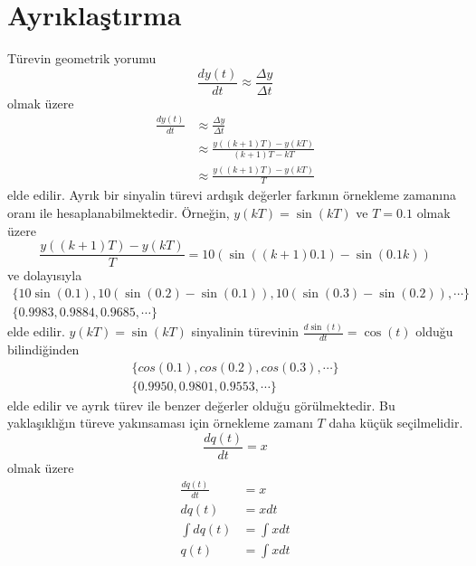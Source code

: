 \chapter{Ayrıklaştırma}
Türevin geometrik yorumu 
\begin{equation}
    \frac{dy(t)}{dt}\approx\frac{\Delta y}{\Delta t}
\end{equation}
olmak üzere
\begin{equation}
\begin{split}
    \frac{dy(t)}{dt}&\approx\frac{\Delta y}{\Delta t}\\
    &\approx\frac{y((k+1)T)-y(kT)}{(k+1)T-kT}\\
    &\approx\frac{y((k+1)T)-y(kT)}{T}
\end{split}
\end{equation}
elde edilir. Ayrık bir sinyalin türevi ardışık değerler farkının örnekleme zamanına oranı ile hesaplanabilmektedir. Örneğin, $y(kT)=\sin(kT)$ ve $T=0.1$ olmak üzere
\begin{equation}
    \frac{y((k+1)T)-y(kT)}{T}=10(\sin((k+1)0.1)-\sin(0.1k))
\end{equation}
ve dolayısıyla
\begin{equation}
\begin{split}
    \{10\sin(0.1),10(\sin(0.2)-\sin(0.1)),10(\sin(0.3)-\sin(0.2)),\cdots\}\\
    \{0.9983,0.9884, 0.9685,\cdots\}
\end{split}
\end{equation}
elde edilir. $y(kT)=\sin(kT)$ sinyalinin türevinin $\frac{d\sin(t)}{dt}=\cos(t)$ olduğu bilindiğinden
\begin{equation}
    \begin{split}
        \{cos(0.1),cos(0.2),cos(0.3),\cdots\}\\
        \{ 0.9950,0.9801,0.9553,\cdots\}
    \end{split}
\end{equation}
elde edilir ve ayrık türev ile benzer değerler olduğu görülmektedir. Bu yaklaşıklığın türeve yakınsaması için örnekleme zamanı $T$ daha küçük seçilmelidir. 
\begin{equation}
    \frac{dq(t)}{dt}=x
\end{equation}
olmak üzere
\begin{equation}
\begin{split}
    \frac{dq(t)}{dt}&=x\\
    dq(t)&=xdt\\
    \int dq(t)&=\int xdt\\
    q(t)&=\int xdt
\end{split}
\end{equation}
